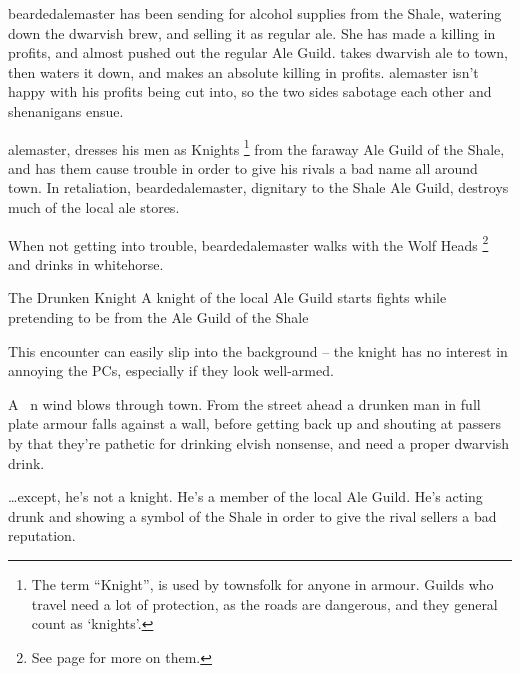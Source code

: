 \begin{multicols}{2}

\label{troubleAle}

\startcontents[sq]

\sqminitoc

\noindent
\Gls{beardedalemaster} has been sending for alcohol supplies from the Shale, watering down the dwarvish brew, and selling it as regular ale.
She has made a killing in profits, and almost pushed out the regular Ale Guild.
\iftoggle{aif}{%
  \footnote{This organization is also known as the `temple of Alass\"{e}' -- see page \pageref{guilds} for more on divine monopolies.}%
}{}%
takes dwarvish ale to \gls{town}, then waters it down, and makes an absolute killing in profits.
\Gls{alemaster} isn't happy with his profits being cut into, so the two sides sabotage each other and shenanigans ensue.

\Gls{alemaster}, dresses his men as Knights%
\footnote{The term ``Knight'', is used by townsfolk for anyone in armour.
Guilds who travel need a lot of protection, as the roads are dangerous, and they general count as `knights'.}
from the faraway Ale Guild of the Shale, and has them cause trouble in order to give his rivals a bad name all around \gls{town}.
In retaliation, \gls{beardedalemaster}, dignitary to the Shale Ale Guild, destroys much of the local ale stores.

When not getting into trouble, \Gls{beardedalemaster} walks with the Wolf Heads%
\footnote{See page \pageref{beardedalemaster} for more on them.}
and drinks in \gls{whitehorse}.

{The Drunken Knight}%
{A knight of the local Ale Guild starts fights while pretending to be from the Ale Guild of the Shale}%

This encounter can easily slip into the background -- the knight has no interest in annoying the PCs, especially if they look well-armed.

\begin{boxtext}

  A \seasonDesc\ \season n wind blows through \gls{town}.
  From the street ahead a drunken man in full plate armour falls against a wall, before getting back up and shouting at passers by that they're pathetic for drinking elvish nonsense, and need a proper dwarvish drink.

\end{boxtext}

\ldots except, he's not a knight.
He's a member of the local Ale Guild.
He's acting drunk and showing a symbol of the Shale in order to give the rival sellers a bad reputation.


\end{multicols}
